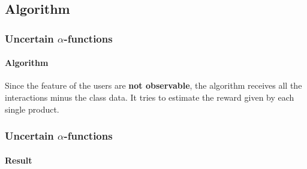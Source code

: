\documentclass[11pt]{beamer}
\begin{document}

\subsection{Algorithm}


\begin{frame}
\frametitle{Uncertain $\alpha$-functions}
\framesubtitle{Algorithm}

Since the feature of the users are \textbf{not observable}, the algorithm receives all the interactions minus the class data.
It tries to estimate the reward given by each single product.

\end{frame}


\begin{frame}

\frametitle{Uncertain $\alpha$-functions}
\framesubtitle{Result}

\end{frame}








\end{document}
